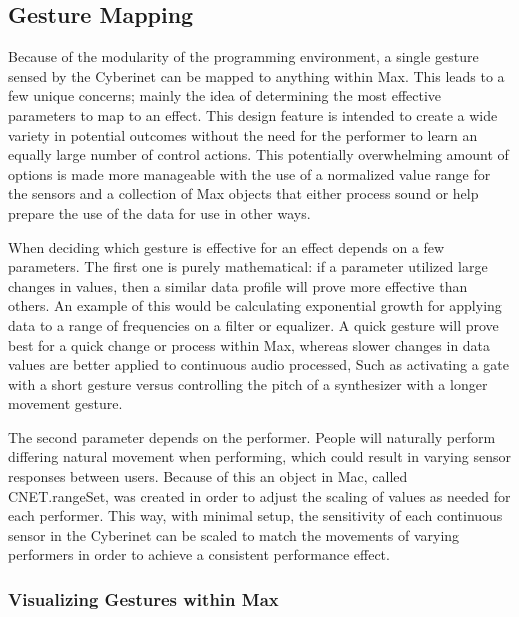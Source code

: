 
\subsection{Gesture Mapping}

Because of the modularity of the programming environment, a single gesture sensed by the Cyberinet can be mapped to anything within Max. This leads to a few unique concerns; mainly the idea of determining the most effective parameters to map to an effect. This design feature is intended to create a wide variety in potential outcomes without the need for the performer to learn an equally large number of control actions. This potentially overwhelming amount of options is made more manageable with the use of a normalized value range for the sensors and a collection of Max objects that either process sound or help prepare the use of the data for use in other ways. 

When deciding which gesture is effective for an effect depends on a few parameters. The first one is purely mathematical: if a parameter utilized large changes in values, then a similar data profile will prove more effective than others. An example of this would be calculating exponential growth for applying data to a range of frequencies on a filter or equalizer. A quick gesture will prove best for a quick change or process within Max, whereas slower changes in data values are better applied to continuous audio processed, Such as activating a gate with a short gesture versus controlling the pitch of a synthesizer with a longer movement gesture. 

The second parameter depends on the performer. People will naturally perform differing natural movement when performing\cite{wanderleyClarinetGesture2005}, which could result in varying sensor responses between users. Because of this an object in Mac, called CNET.rangeSet, was created in order to adjust the scaling of values as needed for each performer. This way, with minimal setup, the sensitivity of each continuous sensor in the Cyberinet can be scaled to match the movements of varying performers in order to achieve a consistent performance effect.

\subsubsection{Visualizing Gestures within Max}

